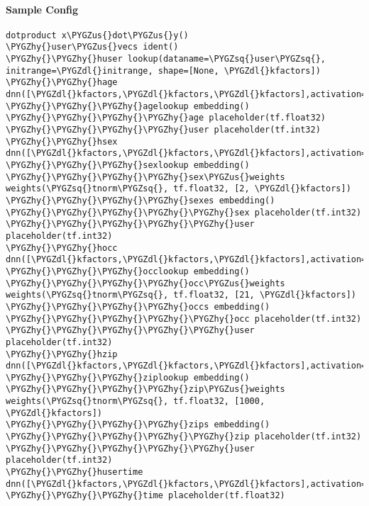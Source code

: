 \documentclass[letterpaper,10pt,english]{sphinxmanual}
\def\PYGZus{\char`\_}
\def\PYGZdl{\char`\$}
\def\PYGZhy{\char`\-}
\def\PYGZsq{\char`\'}
\renewcommand\PYGZsq{\textquotesingle}
\begin{document}
\paragraph{Sample Config}
\label{models:id4}
\begin{Verbatim}[commandchars=\\\{\}]
dotproduct x\PYGZus{}dot\PYGZus{}y()
\PYGZhy{}user\PYGZus{}vecs ident()
\PYGZhy{}\PYGZhy{}huser lookup(dataname=\PYGZsq{}user\PYGZsq{}, initrange=\PYGZdl{}initrange, shape=[None, \PYGZdl{}kfactors])
\PYGZhy{}\PYGZhy{}hage dnn([\PYGZdl{}kfactors,\PYGZdl{}kfactors,\PYGZdl{}kfactors],activation=\PYGZsq{}tanh\PYGZsq{},bn=True,keep\PYGZus{}prob=.8)
\PYGZhy{}\PYGZhy{}\PYGZhy{}agelookup embedding()
\PYGZhy{}\PYGZhy{}\PYGZhy{}\PYGZhy{}age placeholder(tf.float32)
\PYGZhy{}\PYGZhy{}\PYGZhy{}\PYGZhy{}user placeholder(tf.int32)
\PYGZhy{}\PYGZhy{}hsex dnn([\PYGZdl{}kfactors,\PYGZdl{}kfactors,\PYGZdl{}kfactors],activation=\PYGZsq{}tanh\PYGZsq{},bn=True,keep\PYGZus{}prob=None)
\PYGZhy{}\PYGZhy{}\PYGZhy{}sexlookup embedding()
\PYGZhy{}\PYGZhy{}\PYGZhy{}\PYGZhy{}sex\PYGZus{}weights weights(\PYGZsq{}tnorm\PYGZsq{}, tf.float32, [2, \PYGZdl{}kfactors])
\PYGZhy{}\PYGZhy{}\PYGZhy{}\PYGZhy{}sexes embedding()
\PYGZhy{}\PYGZhy{}\PYGZhy{}\PYGZhy{}\PYGZhy{}sex placeholder(tf.int32)
\PYGZhy{}\PYGZhy{}\PYGZhy{}\PYGZhy{}\PYGZhy{}user placeholder(tf.int32)
\PYGZhy{}\PYGZhy{}hocc dnn([\PYGZdl{}kfactors,\PYGZdl{}kfactors,\PYGZdl{}kfactors],activation=\PYGZsq{}tanh\PYGZsq{},bn=True,keep\PYGZus{}prob=None)
\PYGZhy{}\PYGZhy{}\PYGZhy{}occlookup embedding()
\PYGZhy{}\PYGZhy{}\PYGZhy{}\PYGZhy{}occ\PYGZus{}weights weights(\PYGZsq{}tnorm\PYGZsq{}, tf.float32, [21, \PYGZdl{}kfactors])
\PYGZhy{}\PYGZhy{}\PYGZhy{}\PYGZhy{}occs embedding()
\PYGZhy{}\PYGZhy{}\PYGZhy{}\PYGZhy{}\PYGZhy{}occ placeholder(tf.int32)
\PYGZhy{}\PYGZhy{}\PYGZhy{}\PYGZhy{}\PYGZhy{}user placeholder(tf.int32)
\PYGZhy{}\PYGZhy{}hzip dnn([\PYGZdl{}kfactors,\PYGZdl{}kfactors,\PYGZdl{}kfactors],activation=\PYGZsq{}tanh\PYGZsq{},bn=True,keep\PYGZus{}prob=None)
\PYGZhy{}\PYGZhy{}\PYGZhy{}ziplookup embedding()
\PYGZhy{}\PYGZhy{}\PYGZhy{}\PYGZhy{}zip\PYGZus{}weights weights(\PYGZsq{}tnorm\PYGZsq{}, tf.float32, [1000, \PYGZdl{}kfactors])
\PYGZhy{}\PYGZhy{}\PYGZhy{}\PYGZhy{}zips embedding()
\PYGZhy{}\PYGZhy{}\PYGZhy{}\PYGZhy{}\PYGZhy{}zip placeholder(tf.int32)
\PYGZhy{}\PYGZhy{}\PYGZhy{}\PYGZhy{}\PYGZhy{}user placeholder(tf.int32)
\PYGZhy{}\PYGZhy{}husertime dnn([\PYGZdl{}kfactors,\PYGZdl{}kfactors,\PYGZdl{}kfactors],activation=\PYGZsq{}tanh\PYGZsq{},bn=True,keep\PYGZus{}prob=None)
\PYGZhy{}\PYGZhy{}\PYGZhy{}time placeholder(tf.float32)

\end{Verbatim}
\end{document}
